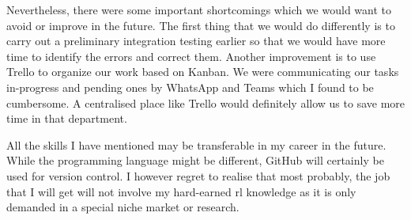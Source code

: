 \documentclass[../main.tex]{subfiles}
\begin{document}
Nevertheless, there were some important shortcomings which we would
want to avoid or improve in the future.
The first thing that we would do differently is to carry out a
preliminary integration testing earlier so that we would have more time
to identify the errors and correct them.
Another improvement is to use Trello to organize our work based on
Kanban.
We were communicating our tasks in-progress and pending ones by
WhatsApp and Teams which I found to be cumbersome. 
A centralised place like Trello would definitely allow us to save more
time in that department.

All the skills I have mentioned may be transferable in my career in the
future.
While the programming language might be different, GitHub will certainly
be used for version control.
I however regret to realise that most probably, the job that I will
get will not involve my hard-earned \gls{rl} knowledge as it is only
demanded in a special niche market or research.
\end{document}
